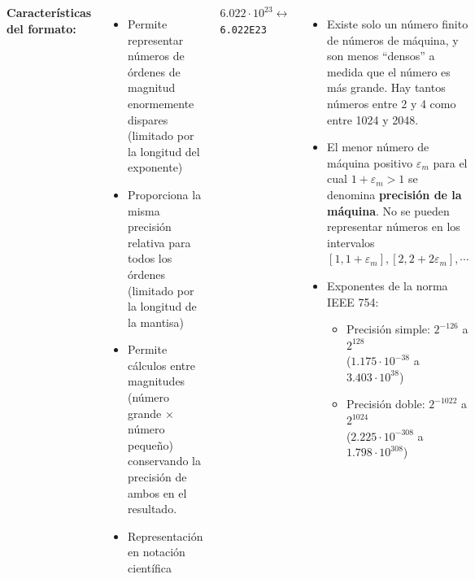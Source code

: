 \documentclass[9pt, aspectratio=169]{beamer}
\begin{document}
\begin{frame}
  \begin{columns}[t]
    \cx
    \textbf{Características del formato:}
    \begin{itemize}
      \item Permite representar números de órdenes de magnitud enormemente dispares (limitado por la longitud del exponente)
      \item Proporciona la misma precisión relativa para todos los órdenes (limitado por la longitud de la mantisa)
      \item Permite cálculos entre magnitudes (número grande $\times$ número pequeño) conservando la precisión de ambos en el resultado.
      \item Representación en notación científica
    \end{itemize}

    \begin{center}
      $6.022 \cdot 10^{23} \longleftrightarrow$ \texttt{6.022E23}
    \end{center}

    \cx
    \begin{itemize}
      \item Existe solo un número finito de números de máquina, y son menos ``densos'' a medida que el número es más grande. Hay tantos números entre 2 y 4 como entre 1024 y 2048.
      \item El menor número de máquina positivo $\varepsilon_m$ para el cual $1 + \varepsilon_m > 1$ se denomina \textbf{precisión de la máquina}. No se pueden representar números en los intervalos $[1, 1 + \varepsilon_m], [2, 2 + 2 \varepsilon_m], \cdots $
      \item Exponentes de la norma IEEE 754:
            \begin{itemize}
              \item Precisión simple: $2^{-126}$ a $2^{128}$ \\ ($1.175 \cdot 10^{-38}$ a $3.403 \cdot 10^{38}$)
              \item Precisión doble: $2^{-1022}$ a $2^{1024}$ \\ ($2.225 \cdot 10^{-308}$ a $1.798 \cdot 10^{308}$)

            \end{itemize}
    \end{itemize}
  \end{columns}
\end{frame}


\end{document}
